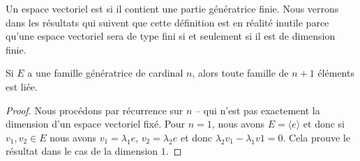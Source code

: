 Un espace vectoriel est  si il contient une partie génératrice finie. Nous verrons dans les résultats qui suivent que cette définition est en réalité inutile parce qu'une espace vectoriel sera de type fini si et seulement si il est de dimension finie.

\begin{lemma}       \label{LemytHnlD}
    Si \( E\) a une famille génératrice de cardinal \( n\), alors toute famille de \( n+1\) éléments est liée.
\end{lemma}

\begin{proof}
    Nous procédons par récurrence sur \( n\) -- qui n'est pas exactement la dimension d'un espace vectoriel fixé. Pour \( n=1\), nous avons \( E=\langle e\rangle\) et donc si \( v_1,v_2\in E\) nous avons \( v_1=\lambda_1 e\), \( v_2=\lambda_2e\) et donc \( \lambda_2v_1-\lambda_1v1=0\). Cela prouve le résultat dans le cas de la dimension \( 1\).


\end{proof}
